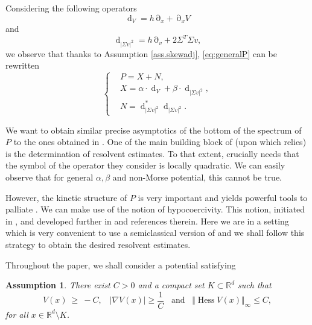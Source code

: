 \documentclass[12pt]{amsart}
\newcommand{\R}{\mathbb R}
\newcommand{\Hess}{\operatorname{Hess}}
\renewcommand{\d}{\operatorname{d}}
\numberwithin{equation}{section}
\numberwithin{figure}{section}
\DeclareMathOperator{\p}{\partial}
\newtheorem{assumption}{Assumption}
\begin{document}
Considering the following operators
\begin{equation}\label{eq:dV}
\d_V = h\p_x + \p_x V
\end{equation}
and
\begin{equation}\label{eq:dSigmav}
\d_{|\Sigma v|^2} = h\p_v + 2\Sigma^T\Sigma v,
\end{equation}
we observe that thanks to Assumption \ref{ass.skewadj}, \eqref{eq:generalP} can be rewritten
\begin{equation}\label{eq:generalP2}
\left\{
\begin{aligned}
&P = X+N,\\
&X = \alpha\cdot \d_V + \beta\cdot\d_{|\Sigma v|^2},\\
&N = \d_{|\Sigma v|^2}^*\d_{|\Sigma v|^2}.
\end{aligned}
\right.
\end{equation}

We want to obtain similar precise asymptotics of the bottom of the spectrum of $P$ to the ones obtained in \cite{HeHiSj11_01,BoLePMi22}. One of the main building block of \cite{HeHiSj08-2} (upon which \cite{HeHiSj11_01,BoLePMi22} relies) is the determination of resolvent estimates. To that extent, \cite{HeHiSj08-2} crucially needs that the symbol of the operator they consider is locally quadratic. We can easily observe that for general $\alpha,\beta$ and non-Morse potential, this cannot be true.

However, the kinetic structure of $P$ is very important and yields powerful tools to palliate \cite{HeHiSj08-2}. We can make use of the notion of hypocoercivity. This notion, initiated in \cite{He06}, and developed %
further in \cite{Vi09,CaDoHeMiMoSc24} and references therein. Here we are in a setting which is very convenient to use a semiclassical version of \cite{DoMoSc15} and we shall follow this strategy %
to obtain the desired resolvent estimates.

Throughout the paper, we shall consider a potential satisfying

\begin{assumption}\label{ass.confin}
There exist $C>0$ and a compact  set $K\subset\R^d$ such that
\begin{equation*}
V(x)\ \geq\  -C,\;\;\;
 \vert\nabla V(x)\vert \geq \frac 1 C\;\;\;\text{and}\;\;\; \Vert\Hess V(x)\Vert_\infty \leq C,
\end{equation*}
for all $x\in\R^d\setminus K$.
\end{assumption}
\end{document}
